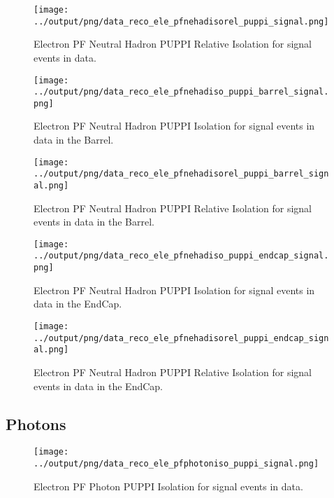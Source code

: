 \documentclass[11pt]{book}
\begin{document}
\begin{figure}[htb]
\centering
\texttt{[image: ../output/png/data\_reco\_ele\_pfnehadisorel\_puppi\_signal.png]}
\caption{Electron PF Neutral Hadron PUPPI Relative Isolation for signal events in data.}
\label{fig:data_ele_pfnehadisorel_puppi_signal}
\end{figure}

\begin{figure}[htb]
\centering
\texttt{[image: ../output/png/data\_reco\_ele\_pfnehadiso\_puppi\_barrel\_signal.png]}
\caption{Electron PF Neutral Hadron PUPPI Isolation for signal events in data in the Barrel.}
\label{fig:data_ele_pfnehadiso_puppi_barrel_signal}
\end{figure}

\begin{figure}[htb]
\centering
\texttt{[image: ../output/png/data\_reco\_ele\_pfnehadisorel\_puppi\_barrel\_signal.png]}
\caption{Electron PF Neutral Hadron PUPPI Relative Isolation for signal events in data in the Barrel.}
\label{fig:data_ele_pfnehadisorel_puppi_barrel_signal}
\end{figure}

\begin{figure}[htb]
\centering
\texttt{[image: ../output/png/data\_reco\_ele\_pfnehadiso\_puppi\_endcap\_signal.png]}
\caption{Electron PF Neutral Hadron PUPPI Isolation for signal events in data in the EndCap.}
\label{fig:data_ele_pfnehadiso_puppi_endcap_signal}
\end{figure}

\begin{figure}[htb]
\centering
\texttt{[image: ../output/png/data\_reco\_ele\_pfnehadisorel\_puppi\_endcap\_signal.png]}
\caption{Electron PF Neutral Hadron PUPPI Relative Isolation for signal events in data in the EndCap.}
\label{fig:data_ele_pfnehadisorel_puppi_endcap_signal}
\end{figure}
\clearpage

\subsection{Photons}
\begin{figure}[htb]
\centering
\texttt{[image: ../output/png/data\_reco\_ele\_pfphotoniso\_puppi\_signal.png]}
\caption{Electron PF Photon PUPPI Isolation for signal events in data.}
\label{fig:data_ele_pfphotoniso_puppi_signal}
\end{figure}
\end{document}

